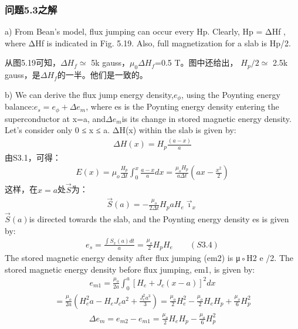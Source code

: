 \subsubsection{问题5.3之解}
a) From Bean’s model, flux jumping can occur every Hp. Clearly, Hp = ΔHf ,
where ΔHf is indicated in Fig. 5.19. Also, full magnetization for a slab is Hp/2.

从图5.19可知，$\Delta H_f\simeq$ 5k gauss，$\mu_{0}\Delta H_f$=0.5 T。图中还给出，
$H_p/2\simeq$ 2.5k gauss，是$\Delta H_f$的一半。他们是一致的。

b) We can derive the flux jump energy density,$e_{\phi}$, using the Poynting energy
balance:$e_s=e_{\phi}+\Delta e_m$, where es is the Poynting energy density entering the
superconductor at x=a, and$\Delta e_m$is its change in stored magnetic energy density.
Let’s consider only 0 ≤ x ≤ a. ΔH(x) within the slab is given by:
\begin{align*}%
\Delta H(x)=H_{p}\frac{(a-x)}{a}\tag{S3.1}
\end{align*}
由S3.1，可得：
\begin{align*}%
E(x)=\mu_{o}\frac{H_{p}}{\Delta t}\int_{0}^{x}\frac{a-x}{a}dx=\frac{\mu_{o}H_{p}}{a\Delta t}(ax-\frac{x^{2}}{2})\tag{S3.2}
\end{align*}
这样，在$x=a$处$\vec{S}$为：
\begin{align*}%
\vec{S}(a)=-\frac{\mu_{o}}{2\Delta t}H_{p}aH_{e}\vec{\imath}_{x}\tag{S3.3}
\end{align*}
$\vec{S}(a)$is directed towards the slab, and the Poynting energy density es is given by:
\begin{align*}%
e_{s}=\frac{\int S_{x}(a)dt}{a}=\frac{\mu_{o}}{2}H_{p}H_{e}\qquad(S3.4)
\end{align*}
The stored magnetic energy density after flux jumping (em2) is μ◦H2
e /2. The stored magnetic energy density before flux jumping, em1, is given by:
\begin{align*}%
e_{m1}=\frac{\mu_{o}}{2a}\int_{0}^{a}[H_{e}+J_{c}(x-a)]^{2}dx\tag{S3.5}
\end{align*}
\begin{align*}%
=\frac{\mu_{o}}{2a}(H_{e}^{2}a-H_{e}J_{c}a^{2}+\frac{J_{c}^{2}a^{3}}{3})=\frac{\mu_{o}}{2}H_{e}^{2}-\frac{\mu_{o}}{2}H_{e}H_{p}+\frac{\mu_{o}}{6}H_{p}^{2}\tag{S3.6}
\end{align*}
\begin{align*}%
\Delta e_{m}=e_{m2}-e_{m1}=\frac{\mu_{o}}{2}H_{e}H_{p}-\frac{\mu_{o}}{6}H_{p}^{2}\tag{S3.7}
\end{align*}
